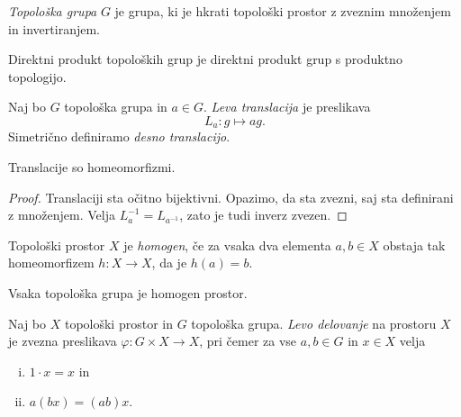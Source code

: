 \begin{definicija}
\emph{Topološka grupa} $G$ je grupa, ki je
hkrati topološki prostor z zveznim množenjem in invertiranjem.
\end{definicija}


\begin{definicija}
Direktni produkt topoloških grup je direktni produkt grup s
produktno topologijo.
\end{definicija}

\begin{definicija}
Naj bo $G$ topološka grupa in $a \in G$.
\emph{Leva translacija} je
preslikava
\[
L_a \colon g \mapsto ag.
\]
Simetrično definiramo \emph{desno translacijo}.
\end{definicija}

\begin{trditev}
Translacije so homeomorfizmi.
\end{trditev}

\begin{proof}
Translaciji sta očitno bijektivni. Opazimo, da sta zvezni, saj sta
definirani z množenjem. Velja $L_a^{-1} = L_{a^{-1}}$, zato je tudi
inverz zvezen.
\end{proof}

\begin{definicija}
Topološki prostor $X$ je
\emph{homogen}, če za vsaka dva
elementa $a, b \in X$ obstaja tak homeomorfizem $h \colon X \to X$,
da je $h(a) = b$.
\end{definicija}

\begin{posledica}
Vsaka topološka grupa je homogen prostor.
\end{posledica}

\begin{definicija}
Naj bo $X$ topološki prostor in $G$ topološka grupa.
\emph{Levo delovanje} na prostoru
$X$ je zvezna preslikava $\varphi \colon G \times X \to X$, pri
čemer za vse $a, b \in G$ in $x \in X$ velja

\begin{enumerate}[i)]
\item $1 \cdot x = x$ in
\item $a(bx) = (ab)x$.
\end{enumerate}
\end{definicija}

